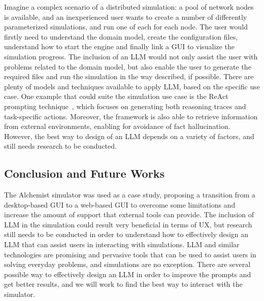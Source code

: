 \documentclass[conference]{IEEEtran}
\begin{document}
Imagine a complex scenario of a distributed simulation: a pool of network nodes is available,
and an inexperienced user wants to create a number of differently parameterized simulations,
and run one of each for each node.
%
The user would firstly need to understand the domain model,
create the configuration files,
understand how to start the engine and finally link a \ac{GUI} to visualize the simulation progress.
%
The inclusion of an \ac{LLM} would not only assist the user with problems related to the domain model,
but also enable the user to generate the required files and run the simulation in the way described,
if possible.
%
There are plenty of models and techniques available to apply \ac{LLM},
based on the specific use case.
%
One example that could suite the simulation use case is the ReAct prompting technique~\cite{DBLP:conf/iclr/YaoZYDSN023},
which focuses on generating both reasoning traces and task-specific actions.
%
Moreover,
the framework is also able to retrieve information from external environments,
enabling for avoidance of fact hallucination.
%
However,
the best way to design of an \ac{LLM} depends on a variety of factors,
and still needs research to be conducted.

\subsection{Conclusion and Future Works}

The Alchemist simulator was used as a case study,
proposing a transition from a desktop-based \ac{GUI} to a web-based \ac{GUI} to overcome some limitations and increase the amount of support that external tools can provide.
%
The inclusion of \ac{LLM} in the simulation could result very beneficial in terms of \ac{UX},
but research still needs to be conducted in order to understand how to effectively design an \ac{LLM} that can assist users in interacting with simulations.
%
\ac{LLM} and similar technologies are promising and pervasive tools that can be used to assist users in solving everyday problems,
and simulations are no exception.
%
%
There are several possible way to effectively design an \ac{LLM} in order to improve the prompts and get better results,
and we will work to find the best way to interact with the simulator.



\vspace{12pt}
\end{document}
